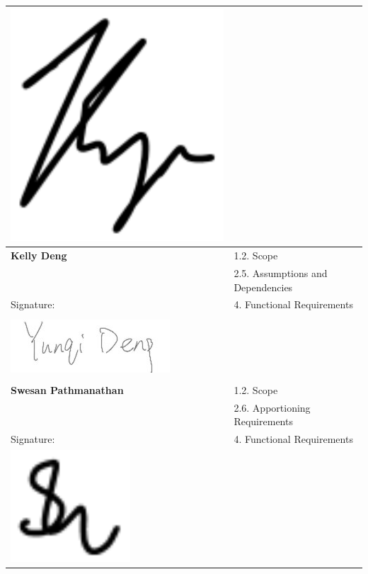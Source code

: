 \documentclass[]{article}
\begin{document}
\begin{enumerate}[{\bf BE1.}]
\begin{center}
\begin{tabular}{|l|l|}
      \includegraphics{Graphics/kyen.png} &  \\
     \hline     
     {\bf Kelly Deng} & 1.2. Scope \\ 
      & 2.5. Assumptions and Dependencies\\
      Signature: & 4. Functional Requirements \\
      & \\
      \includegraphics{Graphics/kelly.jpg} &  \\
      & \\
     \hline
     {\bf Swesan Pathmanathan} & 1.2. Scope \\ 
      & 2.6. Apportioning Requirements \\
      Signature: & 4. Functional Requirements \\
      \includegraphics{Graphics/swesan.png} &  \\
     \hline
\end{tabular}
\end{center}


\end{enumerate}
\end{document}
